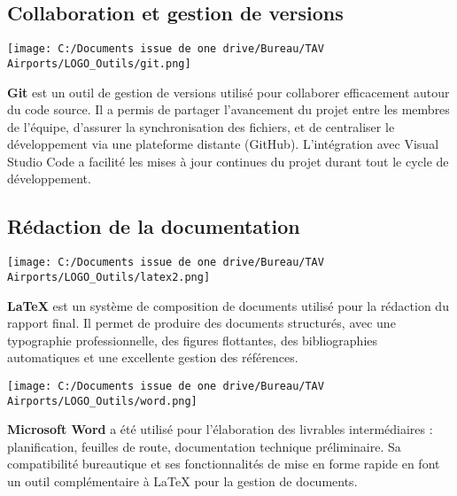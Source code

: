 \documentclass[a4paper,11pt]{report}
\begin{document}
\vspace{1em}
\subsection*{Collaboration et gestion de versions}

\tcolorbox[title=Git]
\begin{minipage}{0.15\textwidth}
  \texttt{[image: C:/Documents issue de one drive/Bureau/TAV Airports/LOGO\_Outils/git.png]}
\end{minipage}
\hfill
\begin{minipage}{0.8\textwidth}
\textbf{Git} est un outil de gestion de versions utilisé pour collaborer efficacement autour du code source. Il a permis de partager l'avancement du projet entre les membres de l'équipe, d'assurer la synchronisation des fichiers, et de centraliser le développement via une plateforme distante (GitHub). L’intégration avec Visual Studio Code a facilité les mises à jour continues du projet durant tout le cycle de développement.\\
\end{minipage}
\endtcolorbox
\newpage

\subsection*{Rédaction de la documentation}

\tcolorbox[title=LaTeX]
\begin{minipage}{0.15\textwidth}
  \texttt{[image: C:/Documents issue de one drive/Bureau/TAV Airports/LOGO\_Outils/latex2.png]}
\end{minipage}
\hfill
\begin{minipage}{0.8\textwidth}
\textbf{LaTeX} est un système de composition de documents utilisé pour la rédaction du rapport final. Il permet de produire des documents structurés, avec une typographie professionnelle, des figures flottantes, des bibliographies automatiques et une excellente gestion des références.
\end{minipage}
\endtcolorbox
\tcolorbox[title=Microsoft Word]
\begin{minipage}{0.15\textwidth}
  \texttt{[image: C:/Documents issue de one drive/Bureau/TAV Airports/LOGO\_Outils/word.png]}
\end{minipage}
\hfill
\begin{minipage}{0.8\textwidth}
\textbf{Microsoft Word} a été utilisé pour l’élaboration des livrables intermédiaires : planification, feuilles de route, documentation technique préliminaire. Sa compatibilité bureautique et ses fonctionnalités de mise en forme rapide en font un outil complémentaire à LaTeX pour la gestion de documents.
\end{minipage}
\endtcolorbox
\end{document}
